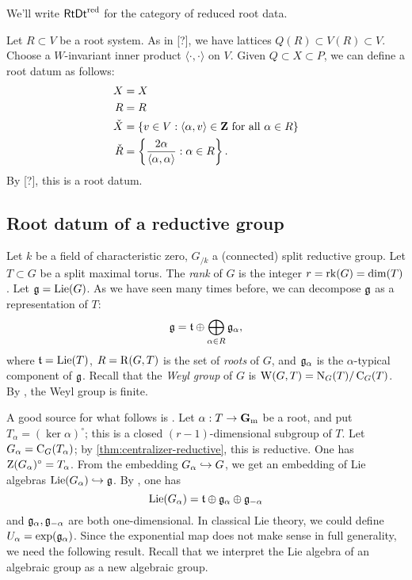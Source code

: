 We'll write $\mathsf{RtDt}^\mathrm{red}$ for the category of reduced root data. 

\begin{example}
Let $R\subset V$ be a root system. As in [?], we have lattices 
$Q(R)\subset V(R)\subset V$. Choose a $W$-invariant inner product 
$\langle\cdot,\cdot\rangle$ on $V$. Given $Q\subset X\subset P$, we can 
define a root datum as follows:
\begin{align*}
  X &= X \\
  R &= R \\
  \check X &= \{v\in V:\langle \alpha,v\rangle\in \mathbf{Z}\text{ for all }\alpha\in R\} \\
  \check R &= \left\{\frac{2\alpha}{\langle \alpha,\alpha\rangle}:\alpha\in R\right\} .
\end{align*}
By [?], this is a root datum. 
\end{example}





\subsection{Root datum of a reductive group}

Let $k$ be a field of characteristic zero, $G_{/k}$ a (connected) split 
reductive group. Let $T\subset G$ be a split maximal torus. The \emph{rank} of 
$G$ is the integer $r=\operatorname{rk}(G)=\dim(T)$. Let $\mathfrak{g}=\operatorname{Lie}(G)$. As we have seen 
many times before, we can decompose $\mathfrak{g}$ as a representation of $T$: 
\[
  \mathfrak{g}=\mathfrak{t}\oplus \bigoplus_{\alpha\in R} \mathfrak{g}_\alpha ,
\]
where $\mathfrak{t}=\operatorname{Lie}(T)$, $R=\operatorname{R}(G,T)$ is the set of \emph{roots} of $G$, and 
$\mathfrak{g}_\alpha$ is the $\alpha$-typical component of $\mathfrak{g}$. Recall that the 
\emph{Weyl group} of $G$ is $\operatorname{W}(G,T)=\operatorname{N}_G(T)/\operatorname{C}_G(T)$. By 
\cite[XII 2.1]{sga3-ii}, the Weyl group is finite. 

A good source for what follows is \cite[II.1]{jantzen-2003}. Let 
$\alpha:T\to \mathbf{G}_\mathrm{m}$ be a root, and put $T_\alpha=(\ker\alpha)^\circ$; this is a 
closed $(r-1)$-dimensional subgroup of $T$. Let 
$G_\alpha=\operatorname{C}_G(T_\alpha)$; by \autoref{thm:centralizer-reductive}, 
this is reductive. One has $\operatorname{Z}(G_\alpha)^\circ=T_\alpha$. From the 
embedding $G_\alpha\hookrightarrow G$, we get an embedding of Lie algebras 
$\operatorname{Lie}(G_\alpha)\hookrightarrow \mathfrak{g}$. By \cite[IX 3.5]{sga3-iii}, one has 
\[
  \operatorname{Lie}(G_\alpha) = \mathfrak{t}\oplus \mathfrak{g}_\alpha \oplus \mathfrak{g}_{-\alpha} 
\]
and $\mathfrak{g}_\alpha,\mathfrak{g}_{-\alpha}$ are both one-dimensional. In classical Lie 
theory, we could define $U_\alpha=\exp(\mathfrak{g}_\alpha)$. Since the exponential map 
does not make sense in full generality, we need the following result. Recall 
that we interpret the Lie algebra of an algebraic group as a new algebraic 
group. 

